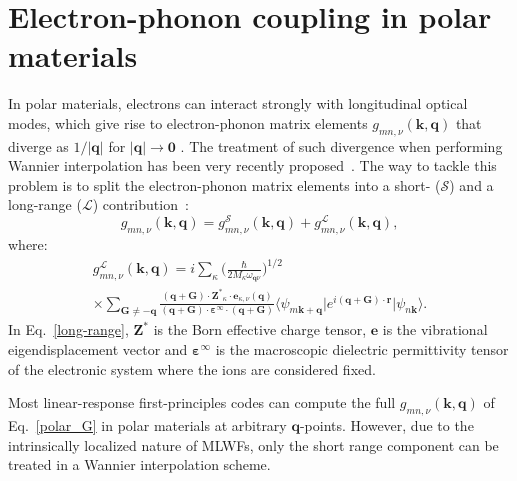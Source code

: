 \documentclass[final,3p,times,twocolumn]{elsarticle}
\begin{document}
\section{Electron-phonon coupling in polar materials}\label{polarmat}
In polar materials, electrons can interact strongly with longitudinal optical modes, which give rise to electron-phonon matrix elements  
 $g_{mn,\nu}(\mathbf{k,q})$ that diverge as $1/|\mathbf{q}|$ for $|\mathbf{q}|\rightarrow \mathbf{0}$ \cite{Frohlich1954,Ponce2015}. 
The treatment of such divergence when performing Wannier interpolation has been very recently proposed~\cite{Verdi2015,Sjakste2015}.
The way to tackle this problem is to split the electron-phonon matrix elements into a short- ($\mathcal{S}$) and a long-range ($\mathcal{L}$) contribution~\cite{Verdi2015}: %
\begin{equation}\label{polar_G}
g_{mn,\nu}(\mathbf{k,q}) = g_{mn,\nu}^{\mathcal{S}}(\mathbf{k,q}) + g_{mn,\nu}^{\mathcal{L}}(\mathbf{k,q}),
\end{equation}
where:
\begin{multline}\label{long-range}
g_{mn,\nu}^{\mathcal{L}}(\mathbf{k,q}) = i \sum_\kappa  \bigg( \frac{\hbar}{2 M_\kappa \omega_{\mathbf{q}\nu} } \bigg)^{1/2} \\
\times \sum_{\mathbf{G}\neq -\mathbf{q}} \frac{(\mathbf{q+G})\cdot \mathbf{Z^*}_\kappa \cdot \mathbf{e}_{\kappa,\nu}(\mathbf{q})}{(\mathbf{q+G}) \cdot \boldsymbol{\varepsilon}^{\infty} \cdot (\mathbf{q+G})} \big\langle  \psi_{m\mathbf{k+q}} \big| e^{i(\mathbf{q+G})\cdot \mathbf{r}} \big| \psi_{n\mathbf{k}} \big\rangle.
\end{multline} 
In Eq.~\eqref{long-range}, $\mathbf{Z^*}$ is the Born effective charge tensor, $\mathbf{e}$ is the vibrational eigendisplacement vector and $\boldsymbol{\varepsilon}^{\infty}$ is the macroscopic dielectric permittivity tensor of the electronic system where the ions are considered fixed.  

Most linear-response first-principles codes can compute the full $g_{mn,\nu}(\mathbf{k,q})$ of Eq.~\eqref{polar_G} in polar materials at arbitrary $\mathbf{q}$-points. However, due to the intrinsically localized nature of MLWFs, only the short range component can be treated in a Wannier interpolation scheme. 
\end{document}
